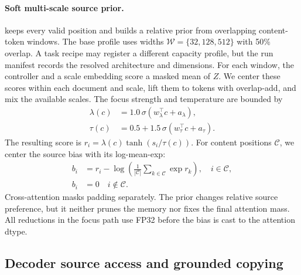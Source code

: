 \paragraph{Soft multi-scale source prior.}
\AFMR keeps every valid position and builds a relative prior from overlapping
content-token windows.  The base profile uses widths
$\mathcal W=\{32,128,512\}$ with 50\% overlap.  A task recipe may register a
different capacity profile, but the run manifest records the resolved
architecture and dimensions.  For each window, the controller and a scale
embedding score a masked mean of $Z$.  We center these scores within each
document and scale, lift them to tokens with overlap-add, and mix the available
scales.  The focus strength and temperature are bounded by
\begin{equation}
  \begin{aligned}
    \lambda(c)&=1.0\,\sigma(w_\lambda^\top c+a_\lambda),\\
    \tau(c)&=0.5+1.5\,\sigma(w_\tau^\top c+a_\tau).
  \end{aligned}
  \label{eq:focus-gates}
\end{equation}
The resulting score is $r_i=\lambda(c)\tanh(s_i/\tau(c))$.  For content
positions $\mathcal C$, we center the source bias with its log-mean-exp:
\begin{equation}
  \begin{aligned}
    b_i&=r_i-\log\left(\frac{1}{|\mathcal C|}
      \sum_{k\in\mathcal C}\exp r_k\right),\quad i\in\mathcal C,\\
    b_i&=0\quad i\notin\mathcal C.
  \end{aligned}
  \label{eq:source-bias}
\end{equation}
Cross-attention masks padding separately.  The prior changes relative source
preference, but it neither prunes the memory nor fixes the final attention mass.
All reductions in the focus path use FP32 before the bias is cast to the
attention dtype.

\subsection{Decoder source access and grounded copying}
\label{sec:decoder-method}

